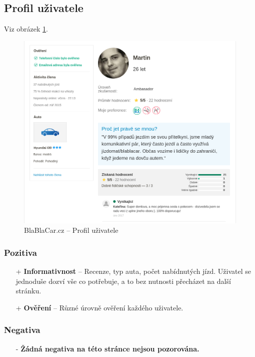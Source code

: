 
\newpage
\subsection{Profil uživatele}
Viz obrázek \ref{fig:blablacar:profile}.
\begin{figure}[h]
    \centering
    \includegraphics[width=1.0\textwidth]{media/blablacar/profile.png}
    \caption{BlaBlaCar.cz -- Profil uživatele}
    \label{fig:blablacar:profile}
\end{figure}
\subsubsection*{Pozitiva}
\begin{itemize}
    \item[+] \textbf{Informativnost} -- Recenze, typ auta, počet nabídnutých jízd. Uživatel se jednoduše dozví vše co potřebuje, a to bez nutnosti přecházet na další stránku.
    \item[+] \textbf{Ověření} -- Různé úrovně ověření každého uživatele.
\end{itemize}
\subsubsection*{Negativa}
\begin{itemize}
    \item[-] \textbf{Žádná negativa na této stránce nejsou pozorována.}
\end{itemize}



